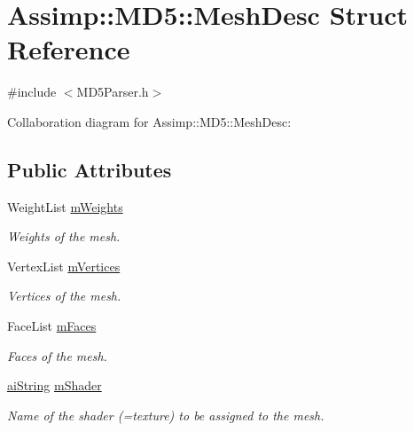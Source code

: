 \hypertarget{struct_assimp_1_1_m_d5_1_1_mesh_desc}{\section{Assimp\+:\+:M\+D5\+:\+:Mesh\+Desc Struct Reference}
\label{struct_assimp_1_1_m_d5_1_1_mesh_desc}
}


{\ttfamily \#include $<$M\+D5\+Parser.\+h$>$}



Collaboration diagram for Assimp\+:\+:M\+D5\+:\+:Mesh\+Desc\+:
\subsection*{Public Attributes}
\begin{DoxyCompactItemize}
\item 
\hypertarget{struct_assimp_1_1_m_d5_1_1_mesh_desc_ac524f0fb06e0edd8de2c3cc1b8cc47c6}{Weight\+List \hyperlink{struct_assimp_1_1_m_d5_1_1_mesh_desc_ac524f0fb06e0edd8de2c3cc1b8cc47c6}{m\+Weights}}\label{struct_assimp_1_1_m_d5_1_1_mesh_desc_ac524f0fb06e0edd8de2c3cc1b8cc47c6}

\begin{DoxyCompactList}\small\item\em Weights of the mesh. \end{DoxyCompactList}\item 
\hypertarget{struct_assimp_1_1_m_d5_1_1_mesh_desc_af59c9ac1ed36c3a8f825b6f0d23002ee}{Vertex\+List \hyperlink{struct_assimp_1_1_m_d5_1_1_mesh_desc_af59c9ac1ed36c3a8f825b6f0d23002ee}{m\+Vertices}}\label{struct_assimp_1_1_m_d5_1_1_mesh_desc_af59c9ac1ed36c3a8f825b6f0d23002ee}

\begin{DoxyCompactList}\small\item\em Vertices of the mesh. \end{DoxyCompactList}\item 
\hypertarget{struct_assimp_1_1_m_d5_1_1_mesh_desc_ab7a639366577b1b29a682e80b355b13f}{Face\+List \hyperlink{struct_assimp_1_1_m_d5_1_1_mesh_desc_ab7a639366577b1b29a682e80b355b13f}{m\+Faces}}\label{struct_assimp_1_1_m_d5_1_1_mesh_desc_ab7a639366577b1b29a682e80b355b13f}

\begin{DoxyCompactList}\small\item\em Faces of the mesh. \end{DoxyCompactList}\item 
\hypertarget{struct_assimp_1_1_m_d5_1_1_mesh_desc_ad3f25e5b8a2cfad29f151cb103d90798}{\hyperlink{structai_string}{ai\+String} \hyperlink{struct_assimp_1_1_m_d5_1_1_mesh_desc_ad3f25e5b8a2cfad29f151cb103d90798}{m\+Shader}}\label{struct_assimp_1_1_m_d5_1_1_mesh_desc_ad3f25e5b8a2cfad29f151cb103d90798}

\begin{DoxyCompactList}\small\item\em Name of the shader (=texture) to be assigned to the mesh. \end{DoxyCompactList}\end{DoxyCompactItemize}



